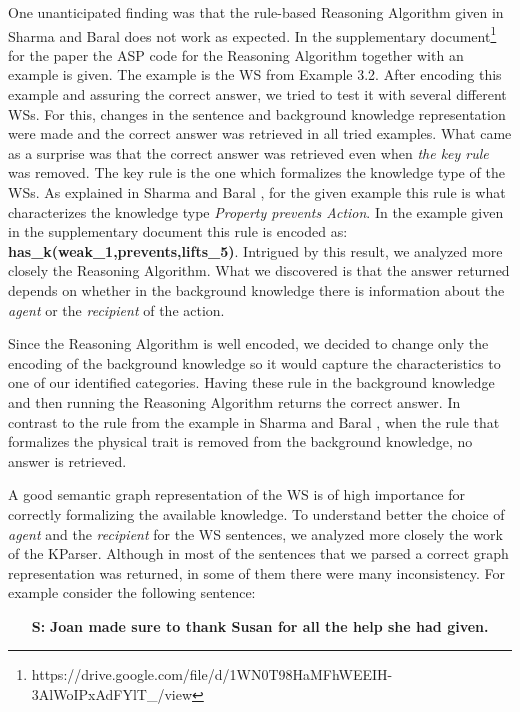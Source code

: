 One unanticipated finding was that the rule-based Reasoning Algorithm given in Sharma and Baral \cite{2018CommonsenseKT} does not work as expected. In the supplementary document\footnote{https://drive.google.com/file/d/1WN0T98HaMFhWEEIH-3AlWoIPxAdFYlT\_/view} for the paper the ASP code for the Reasoning Algorithm together with an example is given. The example is the WS from Example 3.2.
After encoding this example and assuring the correct answer, we tried to test it with several different WSs. For this, changes in the sentence and background knowledge representation were made and the correct answer was retrieved in all tried examples. What came as a surprise was that the correct answer was retrieved even when \textit{the key rule} was removed. The key rule is the one which formalizes the knowledge type of the WSs.
As explained in Sharma and Baral \cite{2018CommonsenseKT}, for the given example this rule is what characterizes the knowledge type \textit{Property prevents Action}. In the example given in the supplementary document this rule is encoded as: \textbf{has\_k(weak\_1,prevents,lifts\_5)}. 
Intrigued by this result, we analyzed more closely the Reasoning Algorithm. What we discovered is that the answer returned depends on whether in the background knowledge there is information about the \textit{agent} or the \textit{recipient} of the action. 

Since the Reasoning Algorithm is well encoded, we decided to change only the encoding of the background knowledge so it would capture the characteristics to one of our identified categories. 
Having these rule in the background knowledge and then running the Reasoning Algorithm returns the correct answer. In contrast to the rule from the example in Sharma and Baral \cite{2018CommonsenseKT}, when the rule that formalizes the physical trait is removed from the background knowledge, no answer is retrieved. 

A good semantic graph representation of the WS is of high importance for correctly formalizing the available knowledge. To understand better the choice of \textit{agent} and the \textit{recipient} for the WS sentences, we analyzed more closely the work of the KParser. Although in most of the sentences that we parsed a correct graph representation was returned, in some of them there were many inconsistency. For example consider the following sentence:
\begin{itemize}
	\item[\textbf{S:}] \textbf{Joan made sure to thank Susan for all the help she had given.}
\end{itemize}

